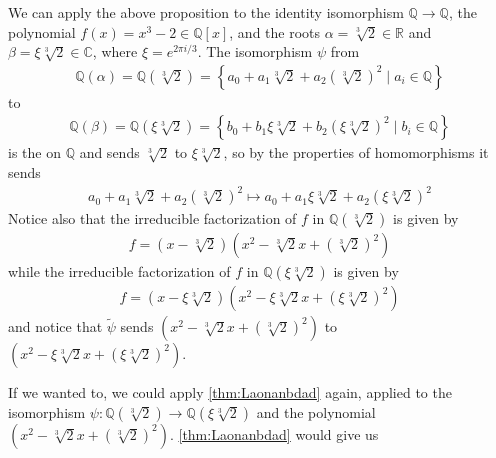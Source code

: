 \documentclass{article}
\begin{document}
\begin{exma}
We can apply the above proposition to the identity isomorphism $\mathbb{Q} \rightarrow \mathbb{Q}$, the polynomial $f(x)=x^{3}-2 \in \mathbb{Q}[x]$, and the roots $\alpha=\sqrt[3]{2} \in \mathbb{R}$ and $\beta=\xi \sqrt[3]{2} \in \mathbb{C}$, where $\xi=e^{2 \pi i / 3}$.
The isomorphism $\psi$ from
\begin{align*}
\mathbb{Q}(\alpha)=\mathbb{Q}(\sqrt[3]{2})=\left\{a_{0}+a_{1} \sqrt[3]{2}+a_{2}(\sqrt[3]{2})^{2} \mid a_{i} \in \mathbb{Q}\right\}
\end{align*}
to
\begin{align*}
\mathbb{Q}(\beta)=\mathbb{Q}(\xi \sqrt[3]{2})=\left\{b_{0}+b_{1} \xi \sqrt[3]{2}+b_{2}(\xi \sqrt[3]{2})^{2} \mid b_{i} \in \mathbb{Q}\right\}
\end{align*}
is the  on $\mathbb{Q}$ and sends $\sqrt[3]{2}$ to $\xi \sqrt[3]{2}$, so by the properties of homomorphisms it sends
\begin{align*}
a_{0}+a_{1} \sqrt[3]{2}+a_{2}(\sqrt[3]{2})^{2} \mapsto a_{0}+a_{1} \xi \sqrt[3]{2}+a_{2}(\xi \sqrt[3]{2})^{2}
\end{align*}
Notice also that the irreducible factorization of $f$ in $\mathbb{Q}(\sqrt[3]{2})$ is given by
\begin{align*}
f=(x-\sqrt[3]{2})\left(x^{2}-\sqrt[3]{2} x+(\sqrt[3]{2})^{2}\right)
\end{align*}
while the irreducible factorization of $f$ in $\mathbb{Q}(\xi \sqrt[3]{2})$ is given by
\begin{align*}
f=(x-\xi \sqrt[3]{2})\left(x^{2}-\xi \sqrt[3]{2} x+(\xi \sqrt[3]{2})^{2}\right)
\end{align*}
and notice that $\tilde{\psi}$ sends $\left(x^{2}-\sqrt[3]{2} x+(\sqrt[3]{2})^{2}\right)$ to $\left(x^{2}-\xi \sqrt[3]{2} x+(\xi \sqrt[3]{2})^{2}\right)$. 

If we wanted to, we could apply \cref{thm:Laonanbdad} again, applied to the isomorphism $\psi: \mathbb{Q}(\sqrt[3]{2}) \rightarrow \mathbb{Q}(\xi \sqrt[3]{2})$ and the polynomial $\left(x^{2}-\sqrt[3]{2} x+(\sqrt[3]{2})^{2}\right)$. \cref{thm:Laonanbdad} would give us 

\end{exma} 
\end{document}
